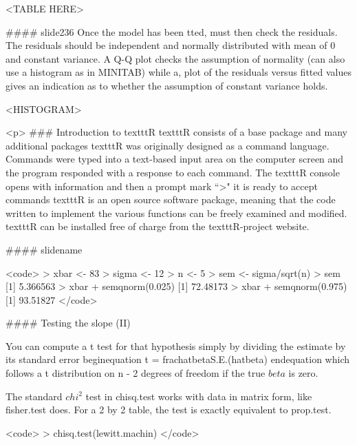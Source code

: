 <TABLE HERE>




#### {slide236}
Once the model has been tted, must then check the residuals.
The residuals should be independent and normally distributed with
mean of 0 and constant variance.
A Q-Q plot checks the assumption of normality (can also use a
histogram as in MINITAB) while a, plot of the residuals versus fitted values gives an indication as to whether the assumption of constant variance holds.

<HISTOGRAM>




<p>
### {Introduction to texttt{R}}
texttt{R} consists of a base package and many additional packages
texttt{R} was originally designed as a command language.  
Commands were typed into a text-based input area on the computer screen and the program responded with a response to each command.
The texttt{R} console opens with information and then a prompt mark  ``>"  it is ready to accept commands
texttt{R}  is an open source software package, meaning that the code written to implement the various functions can be freely examined and modified.
texttt{R} can be installed free of charge from the texttt{R}-project website.


#### {slidename}

 <code>
> xbar <- 83
> sigma <- 12
> n <- 5
> sem <- sigma/sqrt(n)
> sem
[1] 5.366563
> xbar + semqnorm(0.025)
[1] 72.48173
> xbar + semqnorm(0.975)
[1] 93.51827
 </code>



#### {Testing the slope (II)}

You can compute a
t test for that hypothesis simply by dividing the estimate by its standard
error
begin{equation}
t = frac{hat{beta}}{S.E.(hat{beta})}
end{equation}
which follows a t distribution on n - 2 degrees of freedom if the true $beta$ is
zero.



The standard $chi^{2}$ test  in chisq.test works with data in matrix form, like fisher.test does.
For a 2 by 2 table, the test is exactly equivalent to prop.test.



 <code>
> chisq.test(lewitt.machin)
</code>







